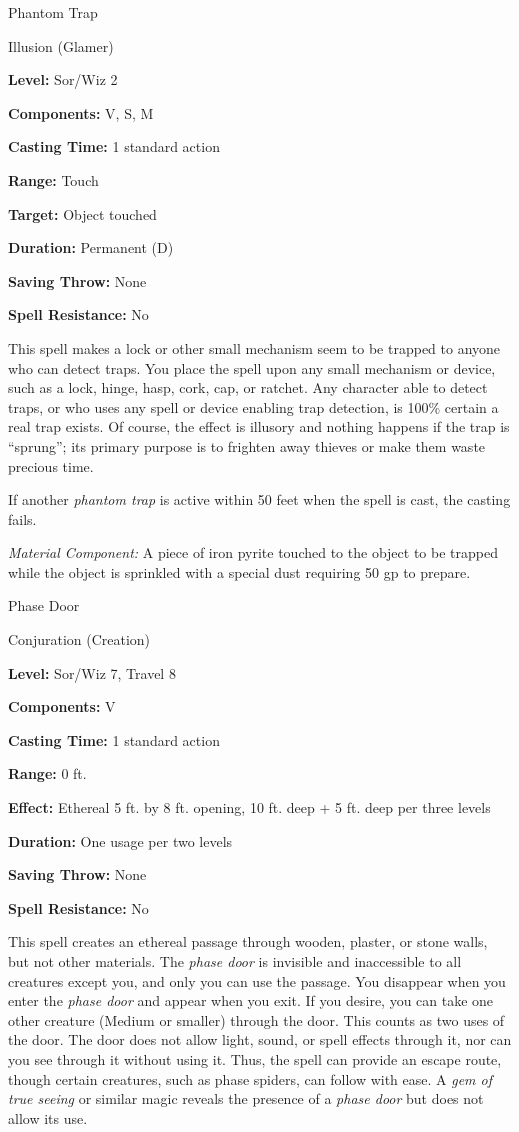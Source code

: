 \documentclass{article}
\begin{document}
\vspace{12pt}
Phantom Trap

Illusion (Glamer)

\textbf{Level:} Sor/Wiz 2

\textbf{Components:} V, S, M

\textbf{Casting Time:} 1 standard action

\textbf{Range:} Touch

\textbf{Target:} Object touched

\textbf{Duration:} Permanent (D)

\textbf{Saving Throw:} None

\textbf{Spell Resistance:} No

This spell makes a lock or other small mechanism seem to be trapped to anyone who 
can detect traps. You place the spell upon any small mechanism or device, such 
as a lock, hinge, hasp, cork, cap, or ratchet. Any character able to detect traps, 
or who uses any spell or device enabling trap detection, is 100\% certain a real 
trap exists. Of course, the effect is illusory and nothing happens if the trap 
is ``sprung''; its primary purpose is to frighten away thieves or make them waste 
precious time.

If another \textit{phantom trap }is active within 50 feet when the spell is cast, 
the casting fails.

\textit{Material Component: }A piece of iron pyrite touched to the object to be 
trapped while the object is sprinkled with a special dust requiring 50 gp to prepare.

\vspace{12pt}
Phase Door

Conjuration (Creation)

\textbf{Level:} Sor/Wiz 7, Travel 8

\textbf{Components:} V

\textbf{Casting Time:} 1 standard action

\textbf{Range:} 0 ft.

\textbf{Effect:} Ethereal 5 ft. by 8 ft. opening, 10 ft. deep + 5 ft. deep per 
three levels

\textbf{Duration:} One usage per two levels

\textbf{Saving Throw:} None

\textbf{Spell Resistance:} No

This spell creates an ethereal passage through wooden, plaster, or stone walls, 
but not other materials. The \textit{phase door }is invisible and inaccessible 
to all creatures except you, and only you can use the passage. You disappear when 
you enter the \textit{phase door }and appear when you exit. If you desire, you 
can take one other creature (Medium or smaller) through the door. This counts as 
two uses of the door. The door does not allow light, sound, or spell effects through 
it, nor can you see through it without using it. Thus, the spell can provide an 
escape route, though certain creatures, such as phase spiders, can follow with 
ease. A \textit{gem of true seeing }or similar magic reveals the presence of a 
\textit{phase door }but does not allow its use.
\end{document}
